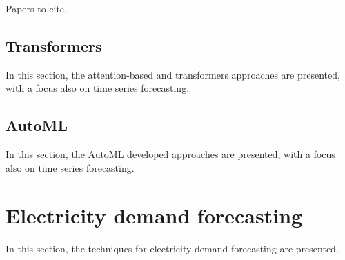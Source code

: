 Papers to cite.
\cite{DEGOOIJER2006443}
\cite{SMYL202075}
\cite{Lim2021}
\cite{ZHANG2003159}
\cite{Nesreen2010}
\cite{SEZER2020106181}
\cite{en16031371}
\cite{HEWAMALAGE2021388}
\cite{BENTAIEB20127067}
\cite{CAO2003321}
\cite{LI2019104785}
\cite{DU2020269}
\cite{Sean2017}
\cite{Masini2023}
\cite{Borovykh2017}
\cite{SHEN2020302}
\cite{DEOSANTOSJUNIOR201972}
\cite{Athiyarath2020}
\cite{Cerqueira2020}
\cite{6210391}
\cite{TEALAB2018334}
\cite{Oliveira2015}
\cite{BERGMEIR2012192}


\vspace{0.1 cm}
\subsection{Transformers}
\label{sec:transformers}
\vspace{0.1 cm}

In this section, the attention-based and transformers approaches are presented, with a focus also on time series forecasting.
\cite{Grigsby2021}
\cite{Wu2020}
\cite{Zhou2020}
\cite{Vaswani2017}
\cite{NIU202148}
\cite{LIM20211748}
\cite{LIU2020113082}
\cite{Shih2019}
\cite{WU2022123990}
\cite{ZHANG2022329}
\cite{9745215}
\cite{10019616}
\cite{9676694}
\cite{9892274}
\cite{9586824}
\cite{9688968}
\cite{HEIDARI2020626}

\vspace{0.1 cm}
\subsection{AutoML}
\label{sec:automl}
\vspace{0.1 cm}

In this section, the AutoML developed approaches are presented, with a focus also on time series forecasting.
\cite{HE2021106622}
\cite{Gijsbers2019}
\cite{Feurer2020}
\cite{Zimmer2020}
\cite{Deng2022}
\cite{su142215292}
\cite{Karmaker2021}
\cite{Chen2021}
\cite{computers10010011}
\cite{Elshawi2019}
\cite{Feurer2015}
\cite{9534091}
\cite{9579526}
\cite{9660073}
\cite{8955514}
\cite{8995391}
\cite{9033810}
\cite{9564380}


\section{Electricity demand forecasting}
\label{sec:demandsoa}
\vspace{0.2 cm}

In this section, the techniques for electricity demand forecasting are presented.

